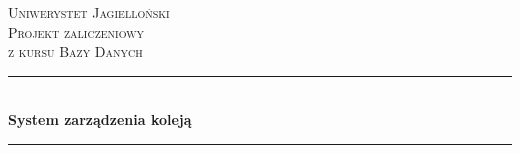 \begin{titlepage}

\newcommand{\HRule}{\rule{\linewidth}{0.5mm}} %

\center %
 

\textsc{\LARGE Uniwerystet Jagielloński}\\[1.5cm] %
\textsc{\Large Projekt zaliczeniowy}\\[0.5cm] %
\textsc{\large z kursu Bazy Danych}\\[0.5cm] %


\HRule \\[0.4cm]
{ \huge \bfseries System zarządzenia koleją}\\[0.4cm] %
\HRule \\[1.5cm]
 



\end{titlepage}
